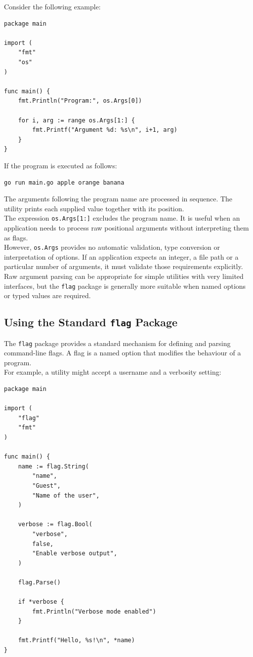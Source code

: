 Consider the following example:

\begin{lstlisting}
package main

import (
    "fmt"
    "os"
)

func main() {
    fmt.Println("Program:", os.Args[0])

    for i, arg := range os.Args[1:] {
        fmt.Printf("Argument %d: %s\n", i+1, arg)
    }
}
\end{lstlisting}

If the program is executed as follows:

\begin{lstlisting}
go run main.go apple orange banana
\end{lstlisting}

The arguments following the program name are processed in sequence. The utility prints each supplied value together with its position.\\

The expression \texttt{os.Args[1:]} excludes the program name. It is useful when an application needs to process raw positional arguments without interpreting them as flags.\\

However, \texttt{os.Args} provides no automatic validation, type conversion or interpretation of options. If an application expects an integer, a file path or a particular number of arguments, it must validate those requirements explicitly.\\

Raw argument parsing can be appropriate for simple utilities with very limited interfaces, but the \texttt{flag} package is generally more suitable when named options or typed values are required.\\

\subsection{Using the Standard \texttt{flag} Package}

The \texttt{flag} package provides a standard mechanism for defining and parsing command-line flags. A flag is a named option that modifies the behaviour of a program.\\

For example, a utility might accept a username and a verbosity setting:

\begin{lstlisting}
package main

import (
    "flag"
    "fmt"
)

func main() {
    name := flag.String(
        "name",
        "Guest",
        "Name of the user",
    )

    verbose := flag.Bool(
        "verbose",
        false,
        "Enable verbose output",
    )

    flag.Parse()

    if *verbose {
        fmt.Println("Verbose mode enabled")
    }

    fmt.Printf("Hello, %s!\n", *name)
}
\end{lstlisting}

